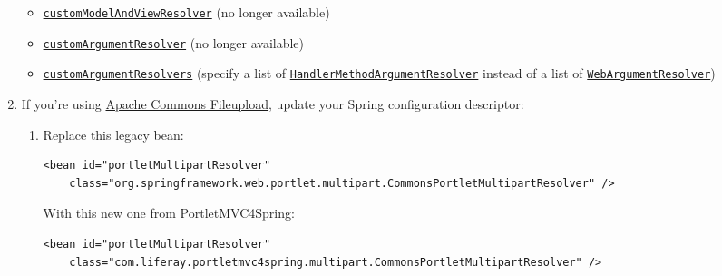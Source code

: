 \begin{enumerate}
  \begin{itemize}
  \item
    \href{https://docs.spring.io/spring-framework/docs/4.3.4.RELEASE/javadoc-api/org/springframework/web/portlet/mvc/annotation/AnnotationMethodHandlerAdapter.html\#setCustomModelAndViewResolver-org.springframework.web.servlet.mvc.annotation.ModelAndViewResolver-}{\texttt{customModelAndViewResolver}}
    (no longer available)
  \item
    \href{https://docs.spring.io/spring-framework/docs/4.3.4.RELEASE/javadoc-api/org/springframework/web/portlet/mvc/annotation/AnnotationMethodHandlerAdapter.html\#setCustomArgumentResolver-org.springframework.web.bind.support.WebArgumentResolver-}{\texttt{customArgumentResolver}}
    (no longer available)
  \item
    \href{https://liferay.github.io/portletmvc4spring/apidocs/com/liferay/portletmvc4spring/mvc/method/annotation/PortletRequestMappingHandlerAdapter.html\#setCustomArgumentResolvers-java.util.List-}{\texttt{customArgumentResolvers}}
    (specify a list of
    \href{https://docs.spring.io/spring/docs/5.1.4.RELEASE/javadoc-api/org/springframework/web/method/support/HandlerMethodArgumentResolver.html}{\texttt{HandlerMethodArgumentResolver}}
    instead of a list of
    \href{https://docs.spring.io/spring-framework/docs/4.3.4.RELEASE/javadoc-api/org/springframework/web/bind/support/WebArgumentResolver.html}{\texttt{WebArgumentResolver}})
  \end{itemize}
\item
  If you're using
  \href{https://commons.apache.org/proper/commons-fileupload/}{Apache
  Commons Fileupload}, update your Spring configuration descriptor:

  \begin{enumerate}
  \def\labelenumii{\arabic{enumii}.}
  \item
    Replace this legacy bean:

\begin{verbatim}
<bean id="portletMultipartResolver"
    class="org.springframework.web.portlet.multipart.CommonsPortletMultipartResolver" />
\end{verbatim}

    With this new one from PortletMVC4Spring:

\begin{verbatim}
<bean id="portletMultipartResolver"
    class="com.liferay.portletmvc4spring.multipart.CommonsPortletMultipartResolver" />
\end{verbatim}
  \end{enumerate}
\end{enumerate}

